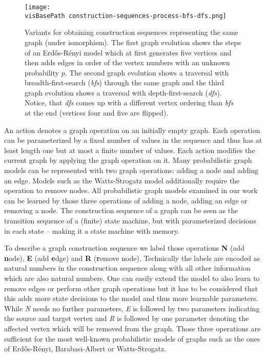 \documentclass{article}
\newcommand{\visBasePath}[0]{vis/}
\begin{document}
\begin{figure*}
  \begin{minipage}[c]{0.47\linewidth}
    \texttt{[image: \\visBasePath construction-sequences-process-bfs-dfs.png]}
  \end{minipage}\hfill
  \begin{minipage}[c]{0.52\linewidth}
    \caption{
		Variants for obtaining construction sequences representing the same graph (under ismorphism).
		The first graph evolution shows the steps of an Erdős-Rényi model which at first generates five vertices and then adds edges in order of the vertex numbers with an unknown probability $p$.
		The second graph evolution shows a traversal with breadth-first-search (\textit{bfs}) through the same graph and the third graph evolution shows a traversal with depth-first-search (\textit{dfs}).
		Notice, that \textit{dfs} comes up with a different vertex ordering than \textit{bfs} at the end (vertices four and five are flipped).
    } \label{fig:construction-sequences}
  \end{minipage}
\end{figure*}

An action denotes a graph operation on an initially empty graph.
Each operation can be parameterized by a fixed number of values in the sequence and thus has at least length one but at most a finite number of values.
Each action modifies the current graph by applying the graph operation on it.
Many probabilistic graph models can be represented with two graph operations:
adding a node and adding an edge.
Models such as the Watts-Strogatz model additionally require the operation to remove nodes.
All probabilistic graph models examined in our work can be learned by those three operations of adding a node, adding an edge or removing a node.
The construction sequence of a graph can be seen as the transition sequence of a (finite) state machine, but with parameterized decisions in each state -- making it a state machine with memory.

To describe a graph construction sequence we label those operations \textbf{N} (add \textbf{n}ode), \textbf{E} (add \textbf{e}dge) and \textbf{R} (\textbf{r}emove node).
Technically the labels are encoded as natural numbers in the construction sequence along with all other information which are also natural numbers.
One can easily extend the model to also learn to remove edges or perform other graph operations but it has to be considered that this adds more state decisions to the model and thus more learnable parameters.
While \textit{N} needs no further parameters, \textit{E} is followed by two parameters indicating the source and target vertex and \textit{R} is followed by one parameter denoting the affected vertex which will be removed from the graph.
Those three operations are sufficient for the most well-known probabilistic models of graphs such as the ones of Erdős-Rényi, Barabasi-Albert or Watts-Strogatz.
\end{document}
